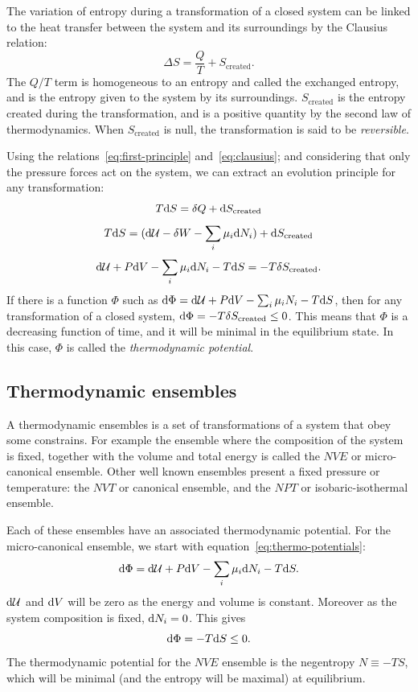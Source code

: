 \documentclass[thesis]{subfiles}
\begin{document}
The variation of entropy during a transformation of a closed system can be
linked to the heat transfer between the system and its surroundings by the
Clausius relation:
\[\Delta S = \frac Q T + S_\text{created}. \label{eq:clausius}\]
The $Q/T$ term is homogeneous to an entropy and called the exchanged entropy,
and is the entropy given to the system by its surroundings. $S_\text{created}$
is the entropy created during the transformation, and is a positive quantity by
the second law of thermodynamics. When $S_\text{created}$ is null, the
transformation is said to be \emph{reversible}.

Using the relations~\eqref{eq:first-principle} and~\eqref{eq:clausius}; and
considering that only the pressure forces act on the system, we can extract an
evolution principle for any transformation:
\[T \text{d} S = \delta Q + \text{d} S_\text{created}\]
\[T \text{d} S = (\text{d} \mathcal{U} - \delta W - \sum_i \mu_i \text{d} N_i) + \text{d} S_\text{created}\]
\[\text{d} \mathcal{U} + P \text{d} V  - \sum_i \mu_i \text{d} N_i - T \text{d} S = -T\delta S_\text{created}.\label{eq:thermo-potentials}\]
If there is a function $\Phi$ such as $\text{d} \Phi = \text{d} \mathcal{U} + P \text{d} V - \sum_i \mu_i
N_i - T \text{d} S$, then for any transformation of a closed system, $\text{d} \Phi =
-T\delta S_\text{created} \leq 0$. This means that $\Phi$ is a decreasing
function of time, and it will be minimal in the equilibrium state. In this case,
$\Phi$ is called the \emph{thermodynamic potential}.

\subsection{Thermodynamic ensembles}

A thermodynamic ensembles is a set of transformations of a system that obey some
constrains. For example the ensemble where the composition of the system is
fixed, together with the volume and total energy is called the $NVE$ or
micro-canonical ensemble. Other well known ensembles present a fixed pressure or
temperature: the $NVT$ or canonical ensemble, and the $NPT$ or
isobaric-isothermal ensemble.

Each of these ensembles have an associated thermodynamic potential. For the
micro-canonical ensemble, we start with equation~\eqref{eq:thermo-potentials}:
\[\text{d} \Phi = \text{d} \mathcal{U} + P \text{d} V - \sum_i \mu_i \text{d} N_i - T \text{d} S.\]
$\text{d} \mathcal{U}$ and $\text{d} V$ will be zero as the energy and volume is constant.
Moreover as the system composition is fixed, $\text{d} N_i = 0$. This gives
\[\text{d} \Phi = - T \text{d} S \leq 0.\]
The thermodynamic potential for the $NVE$ ensemble is the negentropy $N \equiv
-TS$, which will be minimal (and the entropy will be maximal) at equilibrium.
\end{document}
